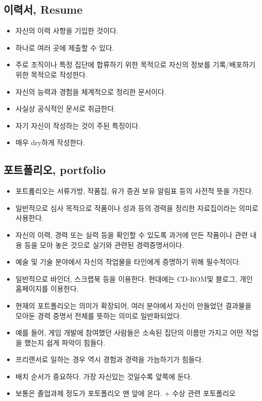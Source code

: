 \documentclass{article}
\begin{document}
\subsection{이력서, Resume}
\begin{itemize}
    \item 자신의 이력 사항을 기입한 것이다.
    \item 하나로 여러 곳에 제출할 수 있다.
    \item 주로 조직이나 특정 집단에 합류하기 위한 목적으로 자신의 정보를 기록/배포하기 위한 목적으로 작성한다.
    \item 자신의 능력과 경험을 체계적으로 정리한 문서이다.
    \item 사실상 공식적인 문서로 취급한다.
    \item 자기 자신이 작성하는 것이 주된 특징이다.
    \item 매우 dry하게 작성한다.
\end{itemize}
\subsection{포트폴리오, portfolio}
\begin{itemize}
    \item 포트폺리오는 서류가방, 작품집, 유가 증권 보유 알림표 등의 사전적 뜻을 가진다.
    \item 일반적으로 심사 목적으로 작품이나 성과 등의 경력을 정리한 자료집이라는 의미로 사용한다.
    \item 자신의 이력, 경력 또는 실력 등을 확인할 수 있도록 과거에 만든 작품이나 관련 내용 등을 모아 놓은 것으로 실기와 관련된 경력증명서이다.
    \item 예술 및 기술 분야에서 자신의 작업물을 타인에게 증명하기 위해 필수적이다.
    \item 일반적으로 바인더, 스크랩북 등을 이용한다. 현대에는 CD-ROM및 블로그, 개인 홈페이지를 이용한다.
    \item 현재의 포트폴리오는 의미가 확장되어, 여러 분야에서 자신이 만들었던 결과물을 모아둔 경력 증명서 전체를 뜻하는 의미로 일반화되었다.
    \item 예를 들어, 게임 개발에 참여했던 사람들은 소속된 집단의 이름만 가지고 어떤 작업을 했는지 쉽게 파악이 힘들다.
    \item 프리랜서로 일하는 경우 역시 경험과 경력을 가늠하기가 힘들다.
    \item 배치 순서가 중요하다. 가장 자신있는 것일수록 앞쪽에 둔다.
    \item 보통은 졸업과제 정도가 포토폴리오 맨 앞에 온다. + 수상 관련 포토폴리오
\end{itemize}
\end{document}
